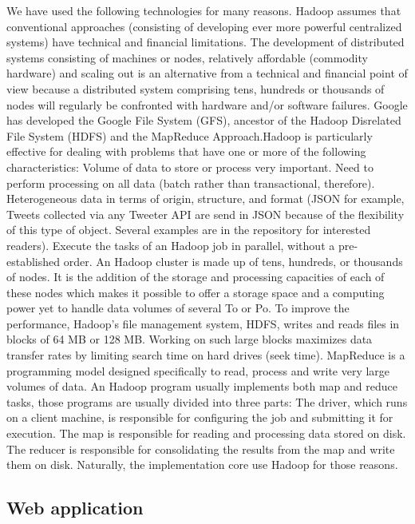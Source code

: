 \documentclass{acmtog} %
\begin{document}
We have used the following technologies for many reasons. Hadoop assumes that conventional approaches (consisting of developing ever more powerful centralized systems) have technical and financial limitations. The development of distributed systems consisting of machines or nodes, relatively affordable (commodity hardware) and scaling out is an alternative from a technical and financial point of view because a distributed system comprising tens, hundreds or thousands of nodes will regularly be confronted with hardware and/or software failures. Google has developed the Google File System (GFS), ancestor of the Hadoop Disrelated File System (HDFS) \cite{Baltas17} and the MapReduce Approach.Hadoop is particularly effective for dealing with problems that have one or more of the following characteristics: Volume of data to store or process very important. Need to perform processing on all data (batch rather than transactional, therefore). Heterogeneous data in terms of origin, structure, and format (JSON for example, Tweets collected via any Tweeter API are send in JSON because of the flexibility of this type of object. Several examples are in the repository for interested readers). Execute the tasks of an Hadoop job in parallel, without a pre-established order. An Hadoop cluster is made up of tens, hundreds, or thousands of nodes. It is the addition of the storage and processing capacities of each of these nodes which makes it possible to offer a storage space and a computing power yet to handle data volumes of several To or Po. To improve the performance, Hadoop's file management system, HDFS, writes and reads files in blocks of 64 MB or 128 MB. Working on such large blocks maximizes data transfer rates by limiting search time on hard drives (seek time). MapReduce is a programming model designed specifically to read, process and write very large volumes of data. An Hadoop program usually implements both map and reduce tasks, those programs are usually divided into three parts: The driver, which runs on a client machine, is responsible for configuring the job and submitting it for execution. The map is responsible for reading and processing data stored on disk. The reducer is responsible for consolidating the results from the map and write them on disk. Naturally, the implementation core use Hadoop for those reasons.

\subsection{Web application}
\label{sec:web_application}
\end{document}
